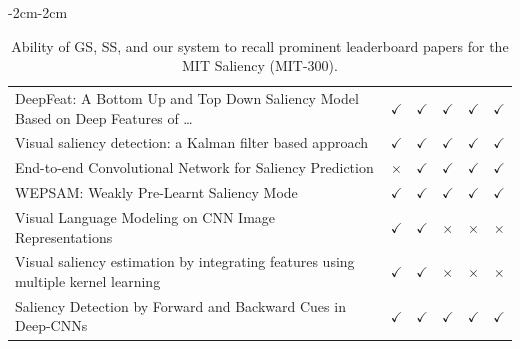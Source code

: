 \documentclass[runningheads]{llncs}
\begin{document}
\begin{table}
\begin{adjustwidth}{-2cm}{-2cm}
{\begin{tabular}{|l|c|c|c|c|c|}
DeepFeat: A Bottom Up and Top Down Saliency Model Based on Deep Features of \dots & \cellcolor{green!20}$\checkmark$ & \cellcolor{green!20}$\checkmark$ & \cellcolor{green!20}$\checkmark$ & \cellcolor{green!20}$\checkmark$ & \cellcolor{green!20}$\checkmark$ \\
Visual saliency detection: a Kalman filter based approach                                             & \cellcolor{green!20}$\checkmark$ & \cellcolor{green!20}$\checkmark$ & \cellcolor{green!20}$\checkmark$ & \cellcolor{green!20}$\checkmark$ & \cellcolor{green!20}$\checkmark$ \\
End-to-end Convolutional Network for Saliency Prediction                                              & \cellcolor{red!20}$\times$     & \cellcolor{green!20}$\checkmark$ & \cellcolor{green!20}$\checkmark$ & \cellcolor{green!20}$\checkmark$ & \cellcolor{green!20}$\checkmark$ \\
WEPSAM: Weakly Pre-Learnt Saliency Mode                                                               & \cellcolor{green!20}$\checkmark$ & \cellcolor{green!20}$\checkmark$ & \cellcolor{green!20}$\checkmark$ & \cellcolor{green!20}$\checkmark$ & \cellcolor{green!20}$\checkmark$ \\
Visual Language Modeling on CNN Image Representations                                                 & \cellcolor{green!20}$\checkmark$ & \cellcolor{green!20}$\checkmark$ & \cellcolor{red!20}$\times$     & \cellcolor{red!20}$\times$     & \cellcolor{red!20}$\times$     \\
Visual saliency estimation by integrating features using multiple kernel learning                     & \cellcolor{green!20}$\checkmark$ & \cellcolor{green!20}$\checkmark$ & \cellcolor{red!20}$\times$     & \cellcolor{red!20}$\times$     & \cellcolor{red!20}$\times$     \\
Saliency Detection by Forward and Backward Cues in Deep-CNNs                                          & \cellcolor{green!20}$\checkmark$ & \cellcolor{green!20}$\checkmark$ & \cellcolor{green!20}$\checkmark$ & \cellcolor{green!20}$\checkmark$ & \cellcolor{green!20}$\checkmark$\\\hline 
\end{tabular}}
\caption{Ability of GS, SS, and our system to recall prominent leaderboard papers for the MIT Saliency (MIT-300).}
\end{adjustwidth}
\end{table}
\end{document}

